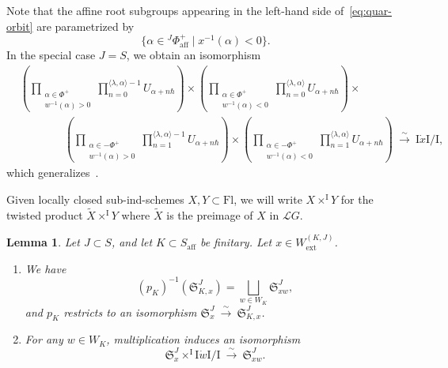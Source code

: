 \documentclass[11pt]{amsart}
\numberwithin{equation}{section}
\theoremstyle{plain}
\newtheorem{lem}[thm]{Lemma}
\theoremstyle{definition}
\newcommand{\I}{{\mathrm I}}
\newcommand{\sL}{{\mathcal L}}
\newcommand{\rQ}{{\mathrm Q}}
\newcommand{\xs}{{\ \xrightarrow{\sim}\ }}
\newcommand{\ex}{\mathrm{ext}}
\newcommand{\af}{\mathrm{aff}}
\newcommand{\Fl}{\mathrm{Fl}}
\newcommand{\rS}{\mathfrak{S}}
\begin{document}
Note that the affine root subgroups appearing in the left-hand side of~\eqref{eq:quar-orbit} are parametrized by
\[
\{ \alpha \in {}^J \Phi_\af^+ \mid x^{-1}(\alpha)<0\}.
\]
In the special case $J=S$, we obtain an isomorphism
\begin{equation*}
\begin{aligned}
&\left(\prod_{\substack{\alpha \in \Phi^+ \\ w^{-1}(\alpha)>0}} \prod_{n=0}^{\langle\lambda,\alpha\rangle-1}U_{\alpha+n\hbar} \right) \times 
\left(\prod_{\substack{\alpha \in \Phi^+ \\ w^{-1}(\alpha)<0}} \prod_{n=0}^{\langle\lambda,\alpha\rangle}U_{\alpha+n\hbar} \right) \times \\
&\qquad\qquad \left(\prod_{\substack{\alpha \in -\Phi^+ \\ w^{-1}(\alpha)>0}} \prod_{n=1}^{\langle\lambda,\alpha\rangle-1}U_{\alpha+n\hbar} \right) \times 
\left(\prod_{\substack{\alpha \in -\Phi^+ \\ w^{-1}(\alpha)<0}} \prod_{n=1}^{\langle\lambda,\alpha\rangle}U_{\alpha+n\hbar} \right)
\xs \I \dot{x} \I/\I, 
\end{aligned}
\end{equation*}
which generalizes~\cite[Lemma~3.2]{adr}.


Given locally closed sub-ind-schemes $X,Y \subset \Fl$, we will write $X \times^\I Y$ for the twisted product $\widetilde{X} \times^\I Y$ where $\widetilde{X}$ is the preimage of $X$ in $\sL G$.

\begin{lem}
\label{lem:min-push}
Let $J \subset S$, and let $K \subset S_\af$ be finitary.
Let $x\in W_\ex^{(K,J)}$.

\begin{enumerate}
\item
\label{it:min-push-1}
We have 
\[
(p_K)^{-1}(\rS^J_{K,x})=\bigsqcup_{{w\in W_K}} \rS^J_{xw},
\]
and $p_K$ restricts to an isomorphism $\rS^J_{x}\xs \rS^J_{K,x}$.
\item
\label{it:min-push-2}
For any $w\in W_K$, multiplication induces an isomorphism
\[
\rS^J_{x}\times^{\I}\I \dot{w}\I/\I \xs 
\rS^J_{xw}. 
\]
\end{enumerate}
\end{lem}
\end{document}
